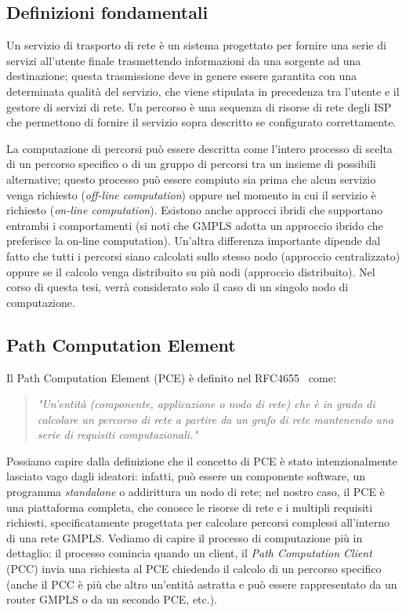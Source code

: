 \documentclass[10pt,a4paper]{report}
\begin{document}
\subsection*{Definizioni fondamentali}

Un servizio di trasporto di rete è un sistema progettato per fornire
una serie di servizi all'utente finale trasmettendo informazioni da
una sorgente ad una destinazione; questa trasmissione deve in genere
essere garantita con una determinata qualità del servizio, che viene
stipulata in precedenza tra l'utente e il gestore di servizi di
rete. Un percorso è una sequenza di risorse di rete degli ISP che
permettono di fornire il servizio sopra descritto se configurato
correttamente.

La computazione di percorsi può essere descritta come l'intero
processo di scelta di un percorso specifico o di un gruppo di percorsi
tra un insieme di possibili alternative; questo processo può essere
compiuto sia prima che alcun servizio venga richiesto
(\textit{off-line computation}) oppure nel momento in cui il servizio
è richiesto (\textit{on-line computation}). Esistono anche approcci
ibridi che supportano entrambi i comportamenti (si noti che GMPLS
adotta un approccio ibrido che preferisce la on-line
computation). Un'altra differenza importante dipende dal fatto che
tutti i percorsi siano calcolati sullo stesso nodo (approccio
centralizzato) oppure se il calcolo venga distribuito su più nodi
(approccio distribuito). Nel corso di questa tesi, verrà considerato
solo il caso di un singolo nodo di computazione.

\subsection*{Path Computation Element}

Il Path Computation Element (PCE) è definito nel
RFC4655~\cite{rfc4655} come:

\begin{quote}
  \textit{"Un'entità (componente, applicazione o nodo di rete) che è in grado
  di calcolare un percorso di rete a partire da un grafo di rete
  mantenendo una serie di requisiti computazionali."}
\end{quote}

Possiamo capire dalla definizione che il concetto di PCE è stato
intenzionalmente lasciato vago dagli ideatori: infatti, può essere un
componente software, un programma \textit{standalone} o addirittura un
nodo di rete; nel nostro caso, il PCE è una piattaforma completa, che
conosce le risorse di rete e i multipli requisiti richiesti,
specificatamente progettata per calcolare percorsi complessi
all'interno di una rete GMPLS. Vediamo di capire il processo di
computazione più in dettaglio: il processo comincia quando un client,
il \textit{Path Computation Client} (PCC) invia una richiesta al PCE
chiedendo il calcolo di un percorso specifico (anche il PCC è più che
altro un'entità astratta e può essere rappresentato da un router GMPLS
o da un secondo PCE, etc.).
\end{document}
